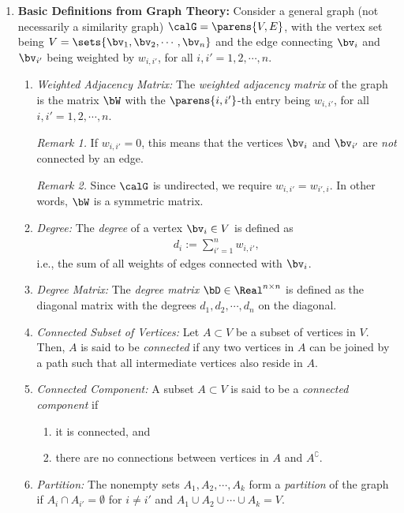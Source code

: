 \documentclass[12pt]{article}
\begin{document}
\begin{enumerate}[label=\textbf{\arabic*.}]
	\item \textbf{Basic Definitions from Graph Theory:} Consider a general graph (not necessarily a similarity graph) $\calG = \parens{V, E}$, with the vertex set being $V = \sets{\bv_1, \bv_2, \cdots, \bv_n}$ and the edge connecting $\bv_i$ and $\bv_{i'}$ being weighted by $w_{i,i'}$, for all $i, i' = 1, 2, \cdots, n$. 
	\begin{enumerate}
		\item \textit{Weighted Adjacency Matrix:} The \emph{weighted adjacency matrix} of the graph is the matrix $\bW$ with the $\parens{i, i'}$-th entry being $w_{i,i'}$, for all $i, i' = 1, 2, \cdots, n$. 
		
		\textit{Remark 1.} If $w_{i,i'} = 0$, this means that the vertices $\bv_i$ and $\bv_{i'}$ are \emph{not} connected by an edge. 
		
		\textit{Remark 2.} Since $\calG$ is undirected, we require $w_{i,i'} = w_{i',i}$. In other words, $\bW$ is a symmetric matrix. 
		
		\item \textit{Degree:} The \emph{degree} of a vertex $\bv_i \in V$ is defined as 
		\begin{align*}
			d_i := \sum_{i'=1}^n w_{i,i'}, 
		\end{align*}
		i.e., the sum of all weights of edges connected with $\bv_i$. 
		
		\item \textit{Degree Matrix:} The \emph{degree matrix} $\bD \in \Real^{n \times n}$ is defined as the diagonal matrix with the degrees $d_1, d_2, \cdots, d_n$ on the diagonal. 
		
		\item \textit{Connected Subset of Vertices:} Let $A \subset V$ be a subset of vertices in $V$. Then, $A$ is said to be \emph{connected} if any two vertices in $A$ can be joined by a path such that all intermediate vertices also reside in $A$. 
		
		\item \textit{Connected Component:} A subset $A \subset V$ is said to be a \emph{connected component} if 
		\begin{enumerate}
			\item it is connected, and 
			\item there are no connections between vertices in $A$ and $A^{\complement}$. 
		\end{enumerate}	
		
		\item \textit{Partition:} The nonempty sets $A_1, A_2, \cdots, A_k$ form a \emph{partition} of the graph if $A_i \cap A_{i'} = \emptyset$ for $i \neq i'$ and $A_1 \cup A_2 \cup \cdots \cup A_k = V$. 
		

\end{enumerate}
\end{enumerate}
\end{document}
